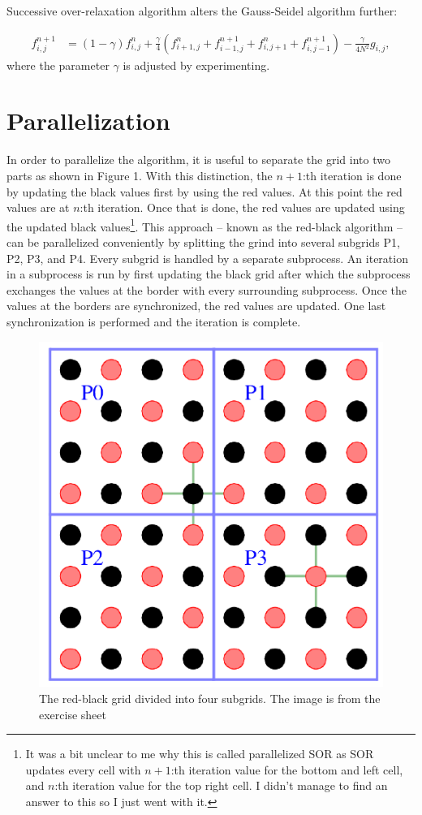 \documentclass[12pt, letterpaper]{article}
\begin{document}
Successive over-relaxation algorithm alters the Gauss-Seidel algorithm further:

\begin{align*}
  f_{i,j}^{n+1} &= (1-\gamma)f_{i,j}^{n} + \frac{\gamma}{4}(f_{i+1,j}^{n}+ f_{i-1,j}^{n+1}+ f_{i,j+1}^{n}+ f_{i,j-1}^{n+1} ) -\frac{\gamma}{4N^2}g_{i,j},
\end{align*}
where the parameter $\gamma$ is adjusted by experimenting.

\section{Parallelization}
In order to parallelize the algorithm, it is useful to separate the grid into two parts as shown in Figure 1.
With this distinction, the $n+1$:th iteration is done by updating the black values first by using the red values.
At this point the red values are at $n$:th iteration.
Once that is done, the red values are updated using the updated black values\footnote{It was a bit unclear to me why this is called parallelized SOR as SOR updates every cell with $n+1$:th iteration value for the bottom and left cell, and $n$:th iteration value for the top right cell. I didn't manage to find an answer to this so I just went with it.}.
This approach -- known as the red-black algorithm -- can be parallelized conveniently by splitting the grind into several subgrids P1, P2, P3, and P4.
Every subgrid is handled by a separate subprocess.
An iteration in a subprocess is run by first updating the black grid after which the subprocess exchanges the values at the border with every surrounding subprocess.
Once the values at the borders are synchronized, the red values are updated.
One last synchronization is performed and the iteration is complete.

\begin{figure}[h!]
  \center
  \includegraphics{redblack.pdf}
  \caption{The red-black grid divided into four subgrids. The image is from the exercise sheet}
\end{figure}
\end{document}
